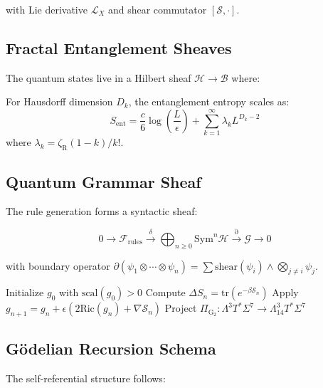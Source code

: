 \documentclass[12pt]{article}
\begin{document}
with Lie derivative $\mathcal{L}_X$ and shear commutator $[\mathcal{S},\cdot]$.

\subsection{Fractal Entanglement Sheaves}
The quantum states live in a Hilbert sheaf $\mathscr{H}\to\mathcal{B}$ where:

\begin{theorem}
For Hausdorff dimension $D_k$, the entanglement entropy scales as:
\begin{equation}
S_{\text{ent}} = \frac{c}{6}\log\left(\frac{L}{\epsilon}\right) + \sum_{k=1}^\infty \lambda_k L^{D_k-2}
\end{equation}
where $\lambda_k = \zeta_{\text{R}}(1-k)/k!$.
\end{theorem}

\subsection{Quantum Grammar Sheaf}
The rule generation forms a syntactic sheaf:

\begin{equation}
0 \to \mathscr{F}_{\text{rules}} \xrightarrow{\delta} \bigoplus_{n\geq0}\text{Sym}^n\mathscr{H} \xrightarrow{\partial} \mathscr{G} \to 0
\end{equation}

with boundary operator $\partial(\psi_1\otimes\cdots\otimes\psi_n) = \sum \text{shear}(\psi_i)\wedge \bigotimes_{j\neq i}\psi_j$.

\begin{algorithm}[H]
\caption{Negentropic Shear Correction}
\begin{algorithmic}[1]
\STATE Initialize $g_0$ with $\text{scal}(g_0)>0$
\STATE Compute $\Delta S_n = \text{tr}(e^{-\beta\mathcal{S}_n})$
\STATE Apply $g_{n+1} = g_n + \epsilon(2\text{Ric}(g_n) + \nabla\mathcal{S}_n)$
\STATE Project $\Pi_{\text{G}_2}: \Lambda^3T^*\Sigma^7 \to \Lambda^3_{14}T^*\Sigma^7$
\ENDFOR
\end{algorithmic}
\end{algorithm}

\subsection{Gödelian Recursion Schema}
The self-referential structure follows:
\end{document}
